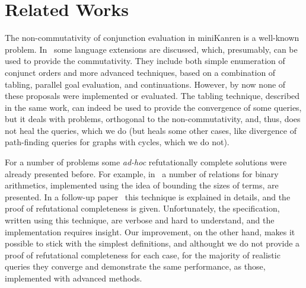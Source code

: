 \section{Related Works}
\label{sec:related_works}

The non-commutativity of conjunction evaluation in miniKanren is a well-known problem. In~\cite{WillThesis} some language extensions are discussed, which,
presumably, can be used to provide the commutativity. They include both simple enumeration of conjunct orders and more advanced techniques, based on a combination
of tabling, parallel goal evaluation, and continuations. However, by now none of these proposals were implemented or evaluated. The tabling technique,
described in the same work, can indeed be used to provide the convergence of some queries, but it deals with problems, orthogonal to the non-commutativity, and,
thus, does not heal the queries, which we do (but heals some other cases, like divergence of path-finding queries for graphs with cycles, which we do not).

For a number of problems some \emph{ad-hoc} refutationally complete solutions were already presented before. For example, in~\cite{TRS} a number of relations for
binary arithmetics, implemented using the idea of bounding the sizes of terms, are presented. In a follow-up paper~\cite{KiselyovArithmetic} this technique is
explained in details, and the proof of refutational completeness is given. Unfortunately, the specification, written using this technique, are verbose and
hard to understand, and the implementation requires insight. Our improvement, on the other hand, makes it possible to stick with the simplest definitions, and
althought we do not provide a proof of refutational completeness for each case, for the majority of realistic queries they converge and demonstrate the same
performance, as those, implemented with advanced methods.
